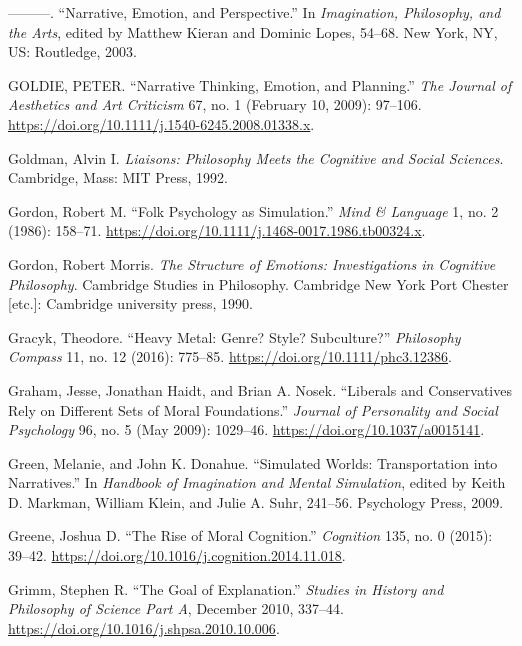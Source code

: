 \documentclass[phdthesis,12pt,final]{wuthesis}
\newlength{\cslhangindent}
\newenvironment{CSLReferences}[2] %
{\begin{list}{}{%
	\setlength{\itemindent}{0pt}
	\setlength{\leftmargin}{0pt}
	\setlength{\parsep}{0pt}
	\ifodd #1
	\setlength{\leftmargin}{\cslhangindent}
	\setlength{\itemindent}{-1\cslhangindent}
	\fi
	\setlength{\itemsep}{#2\baselineskip}}}
{\end{list}}
\theoremstyle{definition}
\theoremstyle{definition}
\theoremstyle{definition}
\theoremstyle{definition}
\theoremstyle{remark}
\begin{document}
\begin{CSLReferences}{1}{0}
---------. {``Narrative, Emotion, and Perspective.''} In \emph{Imagination, {Philosophy}, and the {Arts}}, edited by Matthew Kieran and Dominic Lopes, 54--68. New York, NY, US: Routledge, 2003.

GOLDIE, PETER. {``Narrative {Thinking}, {Emotion}, and {Planning}.''} \emph{The Journal of Aesthetics and Art Criticism} 67, no. 1 (February 10, 2009): 97--106. \url{https://doi.org/10.1111/j.1540-6245.2008.01338.x}.

Goldman, Alvin I. \emph{Liaisons: Philosophy Meets the Cognitive and Social Sciences}. Cambridge, Mass: MIT Press, 1992.

Gordon, Robert M. {``Folk Psychology as Simulation.''} \emph{Mind \& Language} 1, no. 2 (1986): 158--71. \url{https://doi.org/10.1111/j.1468-0017.1986.tb00324.x}.

Gordon, Robert Morris. \emph{The Structure of Emotions: Investigations in Cognitive Philosophy}. Cambridge Studies in Philosophy. Cambridge New York Port Chester {[}etc.{]}: Cambridge university press, 1990.

Gracyk, Theodore. {``Heavy Metal: Genre? {Style}? {Subculture}?''} \emph{Philosophy Compass} 11, no. 12 (2016): 775--85. \url{https://doi.org/10.1111/phc3.12386}.

Graham, Jesse, Jonathan Haidt, and Brian A. Nosek. {``Liberals and Conservatives Rely on Different Sets of Moral Foundations.''} \emph{Journal of Personality and Social Psychology} 96, no. 5 (May 2009): 1029--46. \url{https://doi.org/10.1037/a0015141}.

Green, Melanie, and John K. Donahue. {``Simulated {Worlds}: {Transportation} into {Narratives}.''} In \emph{Handbook of {Imagination} and {Mental Simulation}}, edited by Keith D. Markman, William Klein, and Julie A. Suhr, 241--56. Psychology Press, 2009.

Greene, Joshua D. {``The Rise of Moral Cognition.''} \emph{Cognition} 135, no. 0 (2015): 39--42. \url{https://doi.org/10.1016/j.cognition.2014.11.018}.

Grimm, Stephen R. {``The Goal of Explanation.''} \emph{Studies in History and Philosophy of Science Part A}, December 2010, 337--44. \url{https://doi.org/10.1016/j.shpsa.2010.10.006}.


\end{CSLReferences}
\end{document}
